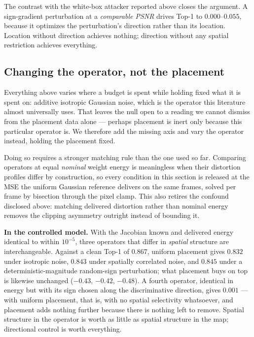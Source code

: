 \documentclass[10pt,journal]{IEEEtran}
\begin{document}
The contrast with the white-box attacker reported above closes the argument.
A sign-gradient perturbation at a \emph{comparable PSNR} drives Top-1 to
$0.000$--$0.055$, because it optimizes the perturbation's direction rather
than its location. Location without direction achieves nothing; direction
without any spatial restriction achieves everything.

\subsection{Changing the operator, not the placement}
\label{sec:operator}

Everything above varies where a budget is spent while holding fixed what it is
spent on: additive isotropic Gaussian noise, which is the operator this
literature almost universally uses. That leaves the null open to a reading we
cannot dismiss from the placement data alone --- perhaps placement is inert
only because this particular operator is. We therefore add the missing axis
and vary the operator instead, holding the placement fixed.

Doing so requires a stronger matching rule than the one used so far.
Comparing operators at equal \emph{nominal} weight energy is meaningless when
their distortion profiles differ by construction, so every condition in this
section is released at the MSE the uniform Gaussian reference delivers on the
same frames, solved per frame by bisection through the pixel clamp. This also
retires the confound disclosed above: matching delivered distortion rather
than nominal energy removes the clipping asymmetry outright instead of
bounding it.

\textbf{In the controlled model.} With the Jacobian known and delivered energy
identical to within $10^{-5}$, three operators that differ in \emph{spatial}
structure are interchangeable. Against a clean Top-1 of $0.867$, uniform
placement gives $0.832$ under isotropic noise, $0.843$ under spatially
correlated noise, and $0.845$ under a deterministic-magnitude random-sign
perturbation; what placement buys on top is likewise unchanged ($-0.43$,
$-0.42$, $-0.48$). A fourth operator, identical in energy but with its sign
chosen along the discriminative direction, gives $0.001$ --- with uniform
placement, that is, with no spatial selectivity whatsoever, and placement adds
nothing further because there is nothing left to remove. Spatial structure in
the operator is worth as little as spatial structure in the map; directional
control is worth everything.
\end{document}
